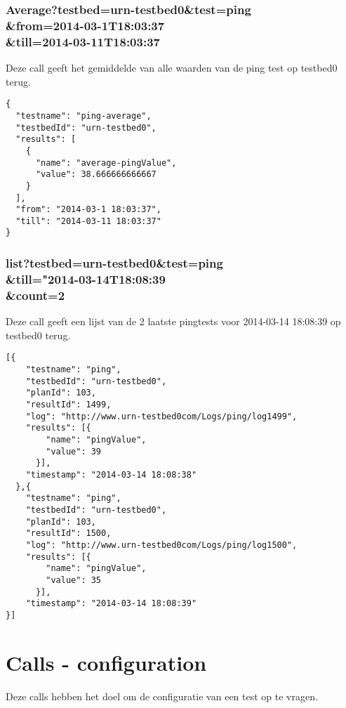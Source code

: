 \documentclass[11pt]{article}
\begin{document}
\subsubsection{Average?testbed=urn-testbed0\&test=ping\\ \&from=2014-03-1T18:03:37\\\&till=2014-03-11T18:03:37}
Deze call geeft het gemiddelde van alle waarden van de ping test op testbed0 terug.
\begin{verbatim}
{
  "testname": "ping-average",
  "testbedId": "urn-testbed0",
  "results": [
    {
      "name": "average-pingValue",
      "value": 38.666666666667
    }
  ],
  "from": "2014-03-1 18:03:37",
  "till": "2014-03-11 18:03:37"
}
\end{verbatim}
\subsubsection{list?testbed=urn-testbed0\&test=ping\\\&till="2014-03-14T18:08:39\\\&count=2}
Deze call geeft een lijst van de 2 laatste pingtests voor 2014-03-14 18:08:39 op testbed0 terug.
\begin{verbatim}
[{
    "testname": "ping",
    "testbedId": "urn-testbed0",
    "planId": 103,
    "resultId": 1499,
    "log": "http://www.urn-testbed0com/Logs/ping/log1499",
    "results": [{
        "name": "pingValue",
        "value": 39
      }],
    "timestamp": "2014-03-14 18:08:38"
  },{
    "testname": "ping",
    "testbedId": "urn-testbed0",
    "planId": 103,
    "resultId": 1500,
    "log": "http://www.urn-testbed0com/Logs/ping/log1500",
    "results": [{
        "name": "pingValue",
        "value": 35
      }],
    "timestamp": "2014-03-14 18:08:39"
}]
\end{verbatim}
\clearpage

\section{Calls - configuration}
Deze calls hebben het doel om de configuratie van een test op te vragen.
\end{document}
